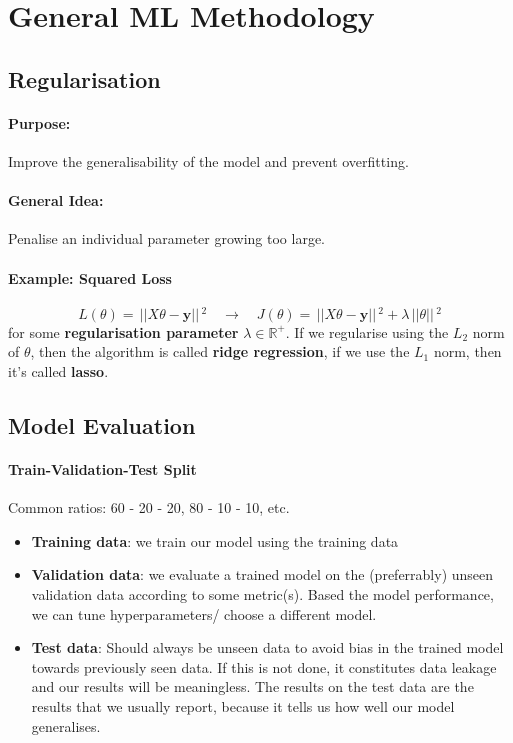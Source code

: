 \documentclass{article}
\renewcommand{\vec}[1]{\mathbf{#1}}
\newcommand{\norm}[1]{\,||#1||\,}
\newcommand{\Reals}{\mathbb{R}}
\begin{document}
\section{General ML Methodology}
\subsection{Regularisation}
\paragraph{Purpose:} Improve the generalisability of the model and prevent
overfitting.
\paragraph{General Idea:} Penalise an individual parameter growing too large.
\paragraph{Example: Squared Loss}
\[
  L(\theta) = \norm{X\theta - \vec{y}}^2 \quad \to \quad J(\theta) = \norm{X\theta
    - \vec{y}}^2 + \lambda\norm{\theta}^2
\]
for some \textbf{regularisation parameter} $\lambda \in \Reals^+$. If we
regularise using the $L_2$ norm of $\theta$, then the algorithm is called
\textbf{ridge regression}, if we use the $L_1$ norm, then it's called \textbf{lasso}.
\subsection{Model Evaluation}
\paragraph{Train-Validation-Test Split}
Common ratios: 60 - 20 - 20, 80 - 10 - 10, etc.
\begin{itemize}
\item \textbf{Training data}: we train our model using the training data
\item \textbf{Validation data}: we evaluate a trained model on the (preferrably)
  unseen validation data according to some metric(s). Based the model
  performance, we can tune hyperparameters/ choose a different model.
\item \textbf{Test data}: Should always be unseen data to avoid bias in the
  trained model towards previously seen data. If this is not done, it
  constitutes data leakage and our results will be meaningless. The results on
  the test data are the results that we usually report, because it tells us how
  well our model generalises.
\end{itemize}
\end{document}
